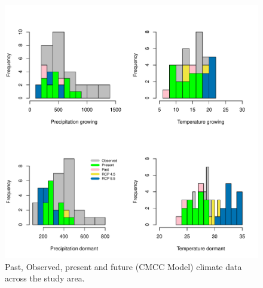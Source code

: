 \documentclass[12pt]{article}
\begin{document}
\begin{figure}[H]
		\centering
		\includegraphics[width=0.99\linewidth]{Figures/CMCC.pdf}
		\caption{Past, Observed, present and future (CMCC Model) climate data across the study area.}
		\label{Sup:projectionCMCC}
\end{figure}
\end{document}
